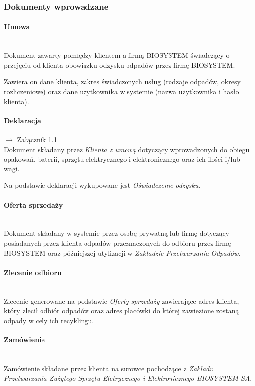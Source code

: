 
\subsubsection{Dokumenty wprowadzane}

	\paragraph{Umowa} \ \\
	Dokument zawarty pomiędzy klientem a firmą BIOSYSTEM świadczący o przejęciu od klienta obowiązku odzysku odpadów przez firmę BIOSYSTEM.

	Zawiera on dane klienta, zakres świadczonych usług (rodzaje odpadów, okresy rozliczeniowe) oraz dane użytkownika w systemie (nazwa użytkownika i hasło klienta).

	\paragraph{Deklaracja} $\rightarrow$ Załącznik 1.1 \\
	Dokument składany przez \emph{Klienta z umową} dotyczący wprowadzonych do obiegu opakowań, baterii, sprzętu elektrycznego i elektronicznego oraz ich ilości i/lub wagi.

	Na podstawie deklaracji wykupowane jest \emph{Oświadczenie odzysku}.

	\paragraph{Oferta sprzedaży} \ \\
	Dokument składany w systemie przez osobę prywatną lub firmę dotyczący posiadanych przez klienta odpadów przeznaczonych do odbioru przez firmę BIOSYSTEM oraz późniejszej utylizacji w \emph{Zakładzie Przetwarzania Odpadów}.

	\paragraph{Zlecenie odbioru} \ \\
	Zlecenie generowane na podstawie \emph{Oferty sprzedaży} zawierające adres klienta, który zlecił odbiór odpadów oraz adres placówki do której zawiezione zostaną odpady w cely ich recyklingu.

	\paragraph{Zamówienie} \ \\
	Zamówienie składane przez klienta na surowce pochodzące z \emph{Zakładu Przetwarzania Zużytego Sprzętu Eletrycznego i Elektronicznego BIOSYSTEM SA}.

